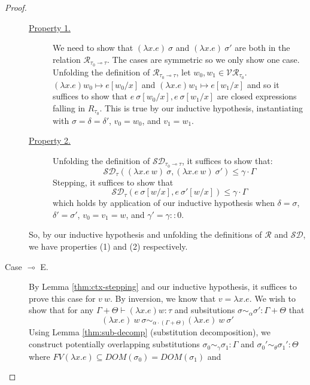 \begin{proof}
\begin{description}
      \begin{description}
        \item[\underline{Property 1.}] We need to show that $(\lambda x . e)~\sigma$ and
          $(\lambda x . e)~\sigma'$ are both in the relation $\mathcal{R}_{\tau_0 \multimap
          \tau}$. The cases are symmetric so we only show one case. Unfolding
          the definition of $\mathcal{R}_{\tau_0 \multimap \tau}$, let $w_0, w_1
          \in \mathcal{VR}_{\tau_0}$. 
          $(\lambda x . e) w_0 \mapsto e[w_0/x]$
          and
          $(\lambda x . e) w_1 \mapsto e[w_1/x]$
          and so it suffices to show that
          $e~\sigma[w_0/x], e~\sigma[w_1/x]$ 
          are closed expressions falling in $R_{\tau_0}$.
          This is true by our inductive hypothesis, instantiating with $\sigma =
          \delta = \delta'$, $v_0 = w_0$, and $v_1 = w_1$.
        \item[\underline{Property 2.}] Unfolding the definition of
          $\mathcal{SD}_{\tau_0 \multimap \tau}$, it suffices to show that:
          $$
          \mathcal{SD}_{\tau}
          ((\lambda x . e~w)~\sigma, (\lambda x . e~w)~\sigma') 
          \leq \gamma \cdot \Gamma
          $$
          Stepping, it suffices to show that
          $$
          \mathcal{SD}_{\tau}
          (e~\sigma[w/x], e~\sigma'[w/x]) 
          \leq \gamma \cdot \Gamma
          $$
          which holds by application of our inductive hypothesis when $\delta =
          \sigma$, $\delta' = \sigma'$, $v_0 = v_1 = w$, and $\gamma' = \gamma
          :: 0$.
      \end{description}
      So, by our inductive hypothesis and unfolding the definitions of
      $\mathcal{R}$ and $\mathcal{SD}$, we have properties (1) and (2)
      respectively. 
    \item[Case $\multimap$ E.] 
      By Lemma \ref{thm:ctx-stepping} and our inductive hypothesis, it suffices
      to prove this case for $v~w$.
      By inversion, we know that $v = \lambda x . e$.
      We wish to show that for any $\Gamma + \Theta \vdash (\lambda x . e) w : \tau$ and
      subsitutions 
      $\sigma \sim_{\alpha} \sigma': \Gamma + \Theta$ 
      that 
      $$(\lambda x . e)~w~\sigma \sim_{\alpha \cdot (\Gamma + \Theta)} (\lambda x . e)~w~\sigma'$$
      Using Lemma \ref{thm:sub-decomp} (substitution decomposition), we
      construct potentially overlapping substitutions 
      $\sigma_0 \sim_{\gamma} \sigma_1 : \Gamma$ 
      and $\sigma_0' \sim_{\theta} \sigma_1' : \Theta$
      where $FV(\lambda x . e) \subseteq DOM(\sigma_0) = DOM(\sigma_1)$ and  

\end{description}
\end{proof}
